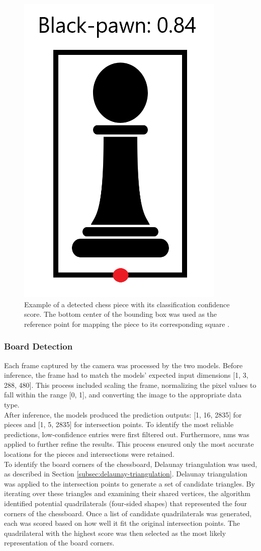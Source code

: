 

\begin{figure}[h!]
    \centering
    \includegraphics[width=0.25\linewidth]{figures/methods/ml-models/black-pawn.png}
    \caption[Detected chess piece and its bounding box]{Example of a detected chess piece with its classification confidence score. The bottom center of the bounding box was used as the reference point for mapping the piece to its corresponding square \cite{svgrepo:black-pawn-svg}.}
    \label{fig:bbox-black-pawn}
\end{figure}


\subsubsection*{Board Detection}

Each frame captured by the camera was processed by the two models. Before inference, the frame had to match the models’ expected input dimensions [1, 3, 288, 480]. This process included scaling the frame, normalizing the pixel values to fall within the range [0, 1], and converting the image to the appropriate data type. \\

After inference, the models produced the prediction outputs: [1, 16, 2835] for pieces and [1, 5, 2835] for intersection points. To identify the most reliable predictions, low-confidence entries were first filtered out. Furthermore, \gls{nms} was applied to further refine the results. This process ensured only the most accurate locations for the pieces and intersections were retained. \\

To identify the board corners of the chessboard, Delaunay triangulation was used, as described in Section \ref{subsec:delaunay-triangulation}. Delaunay triangulation was applied to the intersection points to generate a set of candidate triangles. By iterating over these triangles and examining their shared vertices, the algorithm identified potential quadrilaterals (four-sided shapes) that represented the four corners of the chessboard. Once a list of candidate quadrilaterals was generated, each was scored based on how well it fit the original intersection points. The quadrilateral with the highest score was then selected as the most likely representation of the board corners. \\

